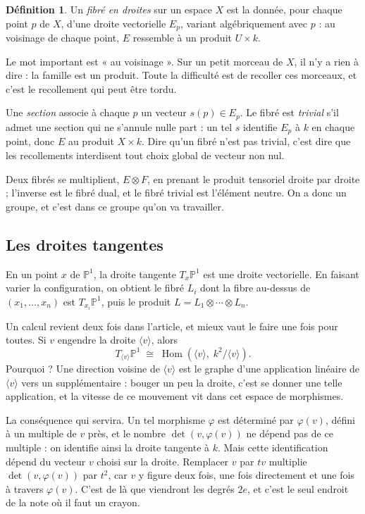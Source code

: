 \documentclass[11pt,a4paper]{amsart}
\theoremstyle{definition}
\newtheorem{definition}{Définition}
\theoremstyle{plain}
\theoremstyle{remark}
\newcommand{\PP}{\mathbb P^1}
\begin{document}
\begin{definition}
Un \emph{fibré en droites} sur un espace $X$ est la donnée, pour chaque point $p$ de $X$, d'une droite vectorielle $E_p$, variant algébriquement avec $p$ : au voisinage de chaque point, $E$ ressemble à un produit $U \times k$.
\end{definition}

Le mot important est « au voisinage ». Sur un petit morceau de $X$, il n'y a rien à dire : la famille est un produit. Toute la difficulté est de recoller ces morceaux, et c'est le recollement qui peut être tordu.

Une \emph{section} associe à chaque $p$ un vecteur $s(p) \in E_p$. Le fibré est \emph{trivial} s'il admet une section qui ne s'annule nulle part : un tel $s$ identifie $E_p$ à $k$ en chaque point, donc $E$ au produit $X \times k$. Dire qu'un fibré n'est pas trivial, c'est dire que les recollements interdisent tout choix global de vecteur non nul.

Deux fibrés se multiplient, $E \otimes F$, en prenant le produit tensoriel droite par droite ; l'inverse est le fibré dual, et le fibré trivial est l'élément neutre. On a donc un groupe, et c'est dans ce groupe qu'on va travailler.

\subsection{Les droites tangentes}

En un point $x$ de $\PP$, la droite tangente $T_x\PP$ est une droite vectorielle. En faisant varier la configuration, on obtient le fibré $L_i$ dont la fibre au-dessus de $(x_1, \dots, x_n)$ est $T_{x_i}\PP$, puis le produit $L = L_1 \otimes \cdots \otimes L_n$.

Un calcul revient deux fois dans l'article, et mieux vaut le faire une fois pour toutes. Si $v$ engendre la droite $\langle v\rangle$, alors
\[
T_{\langle v\rangle}\PP \;\cong\; \operatorname{Hom}(\langle v\rangle,\; k^2/\langle v\rangle).
\]
Pourquoi ? Une direction voisine de $\langle v \rangle$ est le graphe d'une application linéaire de $\langle v\rangle$ vers un supplémentaire : bouger un peu la droite, c'est se donner une telle application, et la vitesse de ce mouvement vit dans cet espace de morphismes.

La conséquence qui servira. Un tel morphisme $\varphi$ est déterminé par $\varphi(v)$, défini à un multiple de $v$ près, et le nombre $\det(v, \varphi(v))$ ne dépend pas de ce multiple : on identifie ainsi la droite tangente à $k$. Mais cette identification dépend du vecteur $v$ choisi sur la droite. Remplacer $v$ par $tv$ multiplie $\det(v, \varphi(v))$ par $t^2$, car $v$ y figure deux fois, une fois directement et une fois à travers $\varphi(v)$. C'est de là que viendront les degrés $2e$, et c'est le seul endroit de la note où il faut un crayon.
\end{document}
